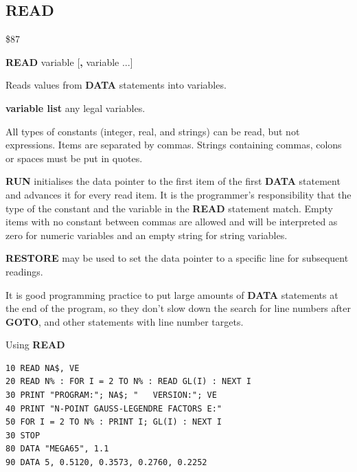 \subsection{READ}
\begin{description}[leftmargin=2cm,style=nextline]
\item [Token:]    \$87

\item [Format:]   {\bf READ} variable [{\bf,} variable ...]

\item [Usage:]    Reads values from {\bf DATA} statements into variables.

                  {\bf variable list} any legal variables.

                  All types of constants (integer, real, and strings) can be read, but not expressions. Items are separated by commas. Strings containing commas, colons or spaces must be put in quotes.

                  {\bf RUN} initialises the data pointer to the first item of the first {\bf DATA} statement and advances it for every read item. It is the programmer's responsibility that the type of the constant and the variable in the {\bf READ} statement match. Empty items with no constant between commas are allowed and will be interpreted as zero for numeric variables and an empty string for string variables.

                  {\bf RESTORE} may be used to set the data pointer to a specific line for subsequent readings.

\item [Remarks:]  It is good programming practice to put large amounts of {\bf DATA} statements at the end of the program, so they don't slow down the search for line numbers after {\bf GOTO}, and other statements with line number targets.

\item [Example:]  Using {\bf READ}

\begin{tcolorbox}[colback=black,coltext=white]
\verbatimfont{\codefont}
\begin{verbatim}
10 READ NA$, VE
20 READ N% : FOR I = 2 TO N% : READ GL(I) : NEXT I
30 PRINT "PROGRAM:"; NA$; "   VERSION:"; VE
40 PRINT "N-POINT GAUSS-LEGENDRE FACTORS E:"
50 FOR I = 2 TO N% : PRINT I; GL(I) : NEXT I
30 STOP
80 DATA "MEGA65", 1.1
90 DATA 5, 0.5120, 0.3573, 0.2760, 0.2252
\end{verbatim}
\end{tcolorbox}
\end{description}

